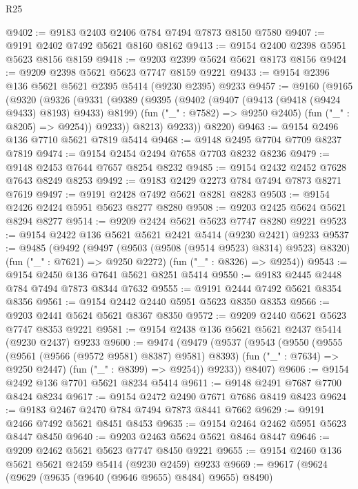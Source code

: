 \begin{lexlean}{R25}
\begin{coremodule}
@9402 := @9183 @2403 @2406 @784 @7494 @7873 @8150 @7580
@9407 := @9191 @2402 @7492 @5621 @8160 @8162
@9413 := @9154 @2400 @2398 @5951 @5623 @8156 @8159
@9418 := @9203 @2399 @5624 @5621 @8173 @8156
@9424 := @9209 @2398 @5621 @5623 @7747 @8159 @9221
@9433 := @9154 @2396 @136 @5621 @5621 @2395 @5414 (@9230 @2395) @9233
@9457 := @9160
    (@9165
      (@9320
        (@9326
          (@9331
            (@9389
              (@9395
                (@9402
                  (@9407 (@9413 (@9418 (@9424 @9433) @8193) @9433) @8199)
                  (fun ("_" : @7582) => @9250 @2405)
                  (fun ("_" : @8205) => @9254))
                @9233))
            @8213)
          @9233))
      @8220)
@9463 := @9154 @2496 @136 @7710 @5621 @7819 @5414
@9468 := @9148 @2495 @7704 @7709 @8237 @7819
@9474 := @9154 @2454 @2494 @7658 @7703 @8232 @8236
@9479 := @9148 @2453 @7644 @7657 @8254 @8232
@9485 := @9154 @2432 @2452 @7628 @7643 @8249 @8253
@9492 := @9183 @2429 @2273 @784 @7494 @7873 @8271 @7619
@9497 := @9191 @2428 @7492 @5621 @8281 @8283
@9503 := @9154 @2426 @2424 @5951 @5623 @8277 @8280
@9508 := @9203 @2425 @5624 @5621 @8294 @8277
@9514 := @9209 @2424 @5621 @5623 @7747 @8280 @9221
@9523 := @9154 @2422 @136 @5621 @5621 @2421 @5414 (@9230 @2421) @9233
@9537 := @9485
    (@9492
      (@9497 (@9503 (@9508 (@9514 @9523) @8314) @9523) @8320)
      (fun ("_" : @7621) => @9250 @2272)
      (fun ("_" : @8326) => @9254))
@9543 := @9154 @2450 @136 @7641 @5621 @8251 @5414
@9550 := @9183 @2445 @2448 @784 @7494 @7873 @8344 @7632
@9555 := @9191 @2444 @7492 @5621 @8354 @8356
@9561 := @9154 @2442 @2440 @5951 @5623 @8350 @8353
@9566 := @9203 @2441 @5624 @5621 @8367 @8350
@9572 := @9209 @2440 @5621 @5623 @7747 @8353 @9221
@9581 := @9154 @2438 @136 @5621 @5621 @2437 @5414 (@9230 @2437) @9233
@9600 := @9474
    (@9479
      (@9537
        (@9543
          (@9550
            (@9555 (@9561 (@9566 (@9572 @9581) @8387) @9581) @8393)
            (fun ("_" : @7634) => @9250 @2447)
            (fun ("_" : @8399) => @9254))
          @9233))
      @8407)
@9606 := @9154 @2492 @136 @7701 @5621 @8234 @5414
@9611 := @9148 @2491 @7687 @7700 @8424 @8234
@9617 := @9154 @2472 @2490 @7671 @7686 @8419 @8423
@9624 := @9183 @2467 @2470 @784 @7494 @7873 @8441 @7662
@9629 := @9191 @2466 @7492 @5621 @8451 @8453
@9635 := @9154 @2464 @2462 @5951 @5623 @8447 @8450
@9640 := @9203 @2463 @5624 @5621 @8464 @8447
@9646 := @9209 @2462 @5621 @5623 @7747 @8450 @9221
@9655 := @9154 @2460 @136 @5621 @5621 @2459 @5414 (@9230 @2459) @9233
@9669 := @9617
    (@9624
      (@9629 (@9635 (@9640 (@9646 @9655) @8484) @9655) @8490)

\end{coremodule}
\end{lexlean}
